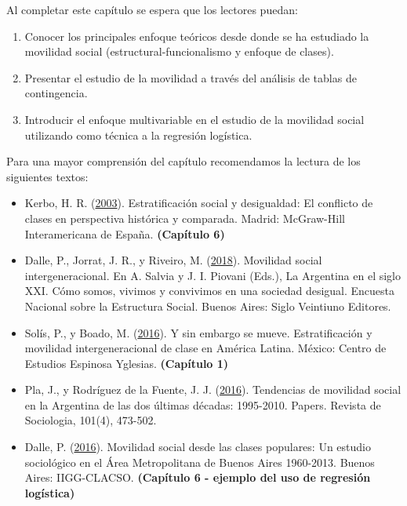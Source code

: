 \documentclass[
]{article}
\providecommand{\tightlist}{%
  \setlength{\itemsep}{0pt}\setlength{\parskip}{0pt}}
\begin{document}
Al completar este capítulo se espera que los lectores puedan:

\begin{enumerate}
\def\labelenumi{\arabic{enumi}.}
\tightlist
\item
  Conocer los principales enfoque teóricos desde donde se ha estudiado la movilidad social (estructural-funcionalismo y enfoque de clases).\\
\item
  Presentar el estudio de la movilidad a través del análisis de tablas de contingencia.\\
\item
  Introducir el enfoque multivariable en el estudio de la movilidad social utilizando como técnica a la regresión logística.
\end{enumerate}

Para una mayor comprensión del capítulo recomendamos la lectura de los siguientes textos:

\begin{itemize}
\item
  Kerbo, H. R. (\protect\hyperlink{ref-Kerbo2003}{2003}). Estratificación social y desigualdad: El conflicto de clases en perspectiva histórica y comparada. Madrid: McGraw-Hill Interamericana de España. \textbf{(Capítulo 6)}
\item
  Dalle, P., Jorrat, J. R., y Riveiro, M. (\protect\hyperlink{ref-Dalle.etal2018}{2018}). Movilidad social intergeneracional. En A. Salvia y J. I. Piovani (Eds.), La Argentina en el siglo XXI. Cómo somos, vivimos y convivimos en una sociedad desigual. Encuesta Nacional sobre la Estructura Social. Buenos Aires: Siglo Veintiuno Editores.
\item
  Solís, P., y Boado, M. (\protect\hyperlink{ref-Solis.Boado2016}{2016}). Y sin embargo se mueve. Estratificación y movilidad intergeneracional de clase en América Latina. México: Centro de Estudios Espinosa Yglesias. \textbf{(Capítulo 1)}
\item
  Pla, J., y Rodríguez de la Fuente, J. J. (\protect\hyperlink{ref-Pla.RodriguezdelaFuente2016}{2016}). Tendencias de movilidad social en la Argentina de las dos últimas décadas: 1995-2010. Papers. Revista de Sociologia, 101(4), 473-502.
\item
  Dalle, P. (\protect\hyperlink{ref-Dalle2016}{2016}). Movilidad social desde las clases populares: Un estudio sociológico en el Área Metropolitana de Buenos Aires 1960-2013. Buenos Aires: IIGG-CLACSO. \textbf{(Capítulo 6 - ejemplo del uso de regresión logística)}
\end{itemize}
\end{document}
